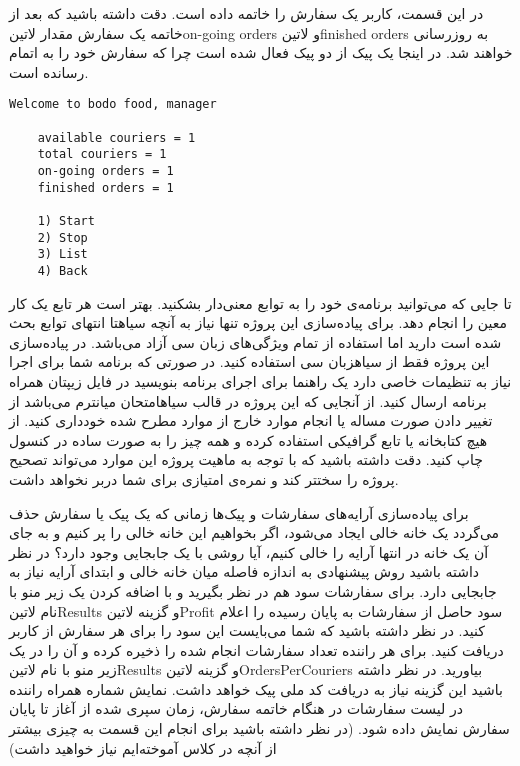 \documentclass[../main.tex]{subfiles}
\begin{document}
در این قسمت، کاربر یک سفارش را خاتمه داده است. دقت داشته باشید که بعد از خاتمه یک سفارش مقدار ‌لاتین{on-going orders} و ‌لاتین{finished orders} به روزرسانی خواهند شد. در اینجا یک پیک از دو پیک فعال شده است چرا که سفارش خود را به اتمام رسانده است.

\begin{latin}
\begin{lstlisting}[]
    Welcome to bodo food, manager

    available couriers = 1
    total couriers = 1
    on-going orders = 1
    finished orders = 1

    1) Start
    2) Stop
    3) List
    4) Back
\end{lstlisting}
\end{latin}


     تا جایی که می‌توانید برنامه‌ی خود را به توابع معنی‌دار بشکنید. بهتر است هر تابع یک کار معین را انجام دهد.
     برای پیاده‌سازی این پروژه تنها نیاز به آنچه ‌سیاه{تا انتهای توابع} بحث شده است دارید اما استفاده از تمام ویژگی‌های زبان سی آزاد می‌باشد.
     در پیاده‌سازی این پروژه فقط از ‌سیاه{زبان سی} استفاده کنید. در صورتی که برنامه شما برای اجرا نیاز به تنظیمات خاصی دارد یک راهنما برای اجرای برنامه بنویسید در فایل زیپتان همراه برنامه ارسال کنید.
     از آنجایی که این پروژه در قالب ‌سیاه{امتحان میانترم} می‌باشد از تغییر دادن صورت مساله یا انجام موارد خارج از موارد مطرح شده خودداری کنید.
     از هیچ کتابخانه یا تابع گرافیکی استفاده کرده و همه چیز را به صورت ساده در کنسول چاپ کنید. دقت داشته باشید که با توجه به ماهیت پروژه این موارد می‌تواند تصحیح پروژه را سختتر کند و نمره‌ی امتیازی برای شما دربر نخواهد داشت.


     برای پیاده‌سازی آرایه‌های سفارشات و پیک‌ها زمانی که یک پیک یا سفارش حذف می‌گردد یک خانه خالی ایجاد می‌شود، اگر بخواهیم این خانه خالی را پر کنیم و به جای آن یک خانه در انتها آرایه را خالی کنیم، آیا روشی با یک جابجایی وجود دارد؟ در نظر داشته باشید روش پیشنهادی به اندازه فاصله میان خانه خالی و ابتدای آرایه نیاز به جابجایی دارد.
     برای سفارشات سود هم در نظر بگیرید و با اضافه کردن یک زیر منو با نام ‌لاتین{Results} و گزینه ‌لاتین{Profit} سود حاصل از سفارشات به پایان رسیده را اعلام کنید. در نظر داشته باشید که شما می‌بایست این سود را برای هر سفارش از کاربر دریافت کنید.
     برای هر راننده تعداد سفارشات انجام شده را ذخیره کرده و آن را در یک زیر منو با نام ‌لاتین{Results} و گزینه ‌لاتین{OrdersPerCouriers} بیاورید. در نظر داشته باشید این گزینه نیاز به دریافت کد ملی پیک خواهد داشت.
     نمایش شماره همراه راننده در لیست سفارشات
     در هنگام خاتمه سفارش، زمان سپری شده از آغاز تا پایان سفارش نمایش داده شود. (در نظر داشته باشید برای انجام این قسمت به چیزی بیشتر از آنچه در کلاس آموخته‌ایم نیاز خواهید داشت)
\end{document}
